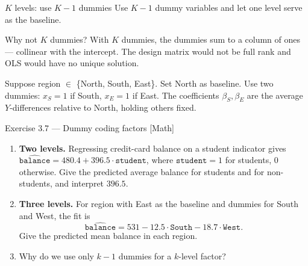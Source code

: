 \documentclass[aspectratio=169,11pt]{beamer}
\begin{document}
\begin{frame}{$K$ levels: use $K-1$ dummies}
  Use $K - 1$ dummy variables and let one level serve as the baseline.
  \begin{alertblock}{Why not $K$ dummies?}
    With $K$ dummies, the dummies sum to a column of ones --- collinear
    with the intercept. The design matrix would not be full rank and
    OLS would have no unique solution.
  \end{alertblock}
  \begin{numexample}
    Suppose region $\in$ \{North, South, East\}. Set North as baseline.
    Use two dummies: $x_S = 1$ if South, $x_E = 1$ if East. The
    coefficients $\beta_S, \beta_E$ are the average $Y$-differences
    relative to North, holding others fixed.
  \end{numexample}
\end{frame}

\begin{frame}{Exercise 3.7 --- Dummy coding factors [Math]}
  \begin{exercise}
    \begin{enumerate}
      \item \textbf{Two levels.} Regressing credit-card balance on a
            student indicator gives
            $\widehat{\texttt{balance}} = 480.4 + 396.5\cdot
            \texttt{student}$, where $\texttt{student}=1$ for students,
            $0$ otherwise. Give the predicted average balance for
            students and for non-students, and interpret $396.5$.
      \item \textbf{Three levels.} For region with East as the baseline
            and dummies for South and West, the fit is
            \[
              \widehat{\texttt{balance}} = 531 - 12.5\cdot\texttt{South}
                - 18.7\cdot\texttt{West}.
            \]
            Give the predicted mean balance in each region.
      \item Why do we use only $k-1$ dummies for a $k$-level factor?
    \end{enumerate}
  \end{exercise}
\end{frame}
\end{document}
